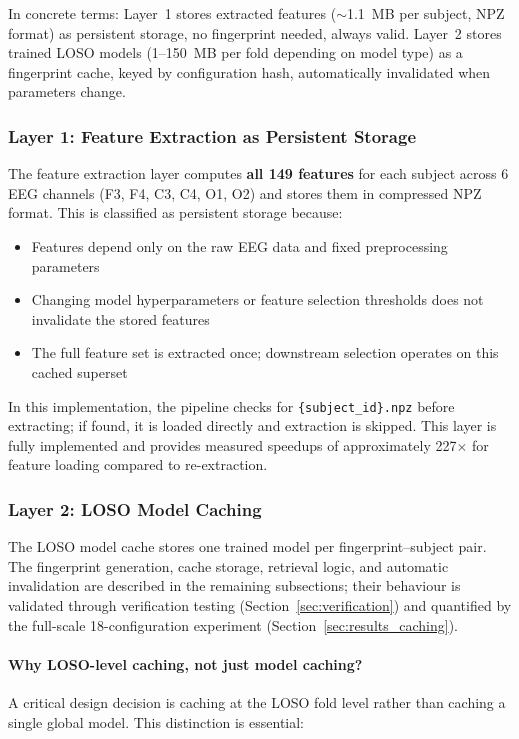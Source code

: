 In concrete terms: Layer~1 stores extracted features ($\sim$1.1~MB per subject,
NPZ format) as persistent storage, no fingerprint needed, always valid.
Layer~2 stores trained LOSO models (1--150~MB per fold depending on model type)
as a fingerprint cache, keyed by configuration hash, automatically
invalidated when parameters change.

\subsubsection{Layer 1: Feature Extraction as Persistent Storage}

The feature extraction layer computes \textbf{all 149 features} for each subject
across 6 EEG channels (F3, F4, C3, C4, O1, O2) and stores them in compressed
NPZ format. This is classified as persistent storage because:

\begin{itemize}
 \item Features depend only on the raw EEG data and fixed preprocessing parameters
 \item Changing model hyperparameters or feature selection thresholds does not invalidate the stored features
 \item The full feature set is extracted once; downstream selection operates on this cached superset
\end{itemize}

In this implementation, the pipeline checks for \texttt{\{subject\_id\}.npz}
before extracting; if found, it is loaded directly and extraction is skipped.
This layer is fully implemented and provides measured speedups of approximately
227$\times$ for feature loading compared to re-extraction.

\subsubsection{Layer 2: LOSO Model Caching}
\label{sec:loso_caching}

The LOSO model cache stores one trained model per fingerprint--subject pair.
The fingerprint generation, cache storage, retrieval logic, and automatic
invalidation are described in the remaining subsections; their behaviour is
validated through verification testing (Section~\ref{sec:verification}) and
quantified by the full-scale 18-configuration experiment
(Section~\ref{sec:results_caching}).

\paragraph{Why LOSO-level caching, not just model caching?}
A critical design decision is caching at the LOSO fold level rather than
caching a single global model. This distinction is essential:

